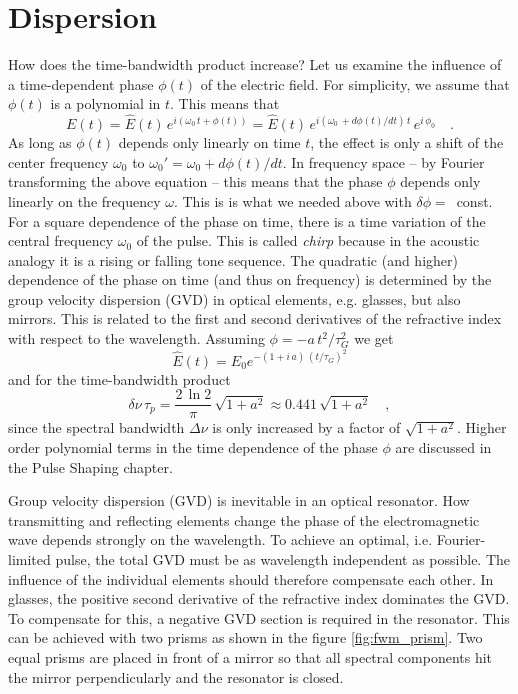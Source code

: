 \section{Dispersion}

How does the time-bandwidth product increase?  Let us examine the influence of a time-dependent phase $\phi(t)$ of the electric field. For simplicity, we assume that $\phi(t)$ is a polynomial in $t$. This means that
\begin{equation}
  E(t) = \hat{E}(t) \, e^{i ( \omega_0 \, t + \phi(t))}
  = \hat{E}(t) \, e^{i ( \omega_0 \, + d\phi(t)/dt) \, t} \, e^{i
  \, \phi_0}  \quad . \label{eq:fwm_field_with_phase}
\end{equation}
As long as $\phi(t)$ depends only linearly on time $t$, the effect is only a shift of the center frequency $\omega_0$ to $\omega_0' = \omega_0 + d\phi(t)/dt$.  In frequency space -- by Fourier transforming the above equation -- this means that the phase $\phi$ depends only linearly on the frequency $\omega$. This is
is what we needed above with $\delta \phi =$~const. For a square
dependence of the phase on time, there is a time variation of the central frequency $\omega_0$ of the pulse. This is called \emph{chirp} because in the acoustic analogy it is a rising or falling tone sequence. The quadratic (and higher) dependence of the phase on time (and thus on frequency) is determined by the group velocity dispersion (GVD) in optical elements, e.g. glasses, but also mirrors. This is related to the first and second derivatives of the refractive index with respect to the wavelength. Assuming $\phi = - a \, t^2 / \tau_G^2$ we get
\begin{equation}
  \hat{E}(t) = \hat{E}_0 e^{- (1 + i \, a) \, ( t / \tau_G ) ^2} \label{eq:fwm_chirp}
\end{equation}
and for the time-bandwidth product
\begin{equation}
  \delta \nu \, \tau_p = \frac{2 \, \ln 2}{\pi} \, \sqrt{1 + a^2} \approx
  0.441 \, \sqrt{1 + a^2} \quad ,
\end{equation}
since the spectral bandwidth $\Delta \nu$ is only increased by a factor of $\sqrt{1 + a^2}$. Higher order polynomial terms in the time dependence of the phase $\phi$ are discussed in the Pulse Shaping chapter.


Group velocity dispersion (GVD) is inevitable in an optical resonator. How transmitting and reflecting elements change the phase of the electromagnetic wave depends strongly on the wavelength. To achieve an optimal, i.e. Fourier-limited pulse, the total GVD must be as wavelength independent as possible. The influence of the individual elements should therefore compensate each other. In glasses, the positive second derivative of the refractive index dominates the GVD. To compensate for this, a negative GVD section is required in the resonator. This can be achieved with two prisms as shown in the figure \ref{fig:fwm_prism}. Two equal prisms are placed in front of a mirror so that all spectral components hit the mirror perpendicularly and the resonator is closed.  

